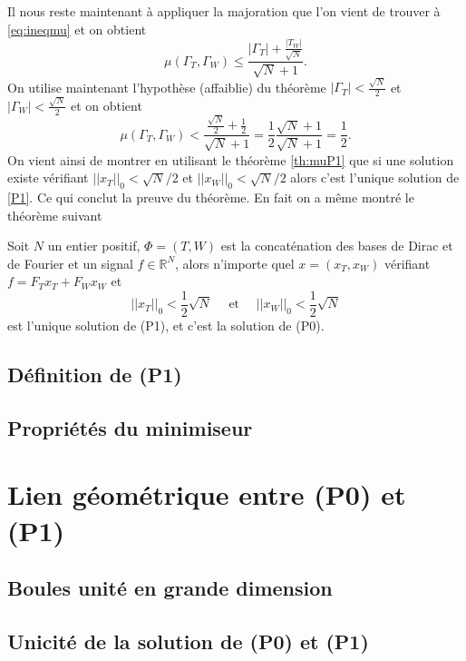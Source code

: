 	Il nous reste maintenant à appliquer la majoration que l'on vient de trouver à \ref{eq:ineqmu} et on obtient
	\begin{equation}
		\mu(\Gamma_T, \Gamma_W) \leq \frac{|\Gamma_T| + \frac{|T_W|}{\sqrt{N}}}{ \sqrt{N}+1}.
	\end{equation}
	On utilise maintenant l'hypothèse (affaiblie) du théorème $|\Gamma_T| < \frac{\sqrt{N}}{2}$ et $|\Gamma_W| < \frac{\sqrt{N}}{2}$ et on obtient
	\begin{equation}
		\mu(\Gamma_T, \Gamma_W) < \frac{\frac{\sqrt{N}}{2} + \frac{1}{2}}{\sqrt{N} + 1} =\frac{1}{2}\frac{\sqrt{N} + 1}{\sqrt{N} + 1} = \frac{1}{2}.
	\end{equation}
	On vient ainsi de montrer en utilisant le théorème \ref{th:muP1} que si une solution existe vérifiant $||x_T||_0 < \sqrt{N}/2$ et $||x_W||_0 < \sqrt{N}/2$ alors c'est l'unique solution de \ref{P1}.
	Ce qui conclut la preuve du théorème.
	En fait on a même montré le théorème suivant 
	\begin{theoreme}
	Soit $N$ un entier positif, $\Phi = (T, W)$ est la concaténation des bases de Dirac et de Fourier et un signal $f\in \mathbb{R}^N$, alors n'importe quel $x = (x_T, x_W)$ vérifiant $f = F_T x_T + F_W x_W$ et
	\begin{equation}\label{eq:cond1}
		||x_T||_0 < \frac{1}{2}\sqrt{N} \quad \text{ et } \quad ||x_W||_0 < \frac{1}{2}\sqrt{N}
	\end{equation}
	est l'unique solution de (P1), et c'est la solution de (P0).
	\end{theoreme}
\subsection{Définition de (P1)}
\subsection{Propriétés du minimiseur}

\section{Lien géométrique entre (P0) et (P1)}
\subsection{Boules unité en grande dimension}
\subsection{Unicité de la solution de (P0) et (P1)}


